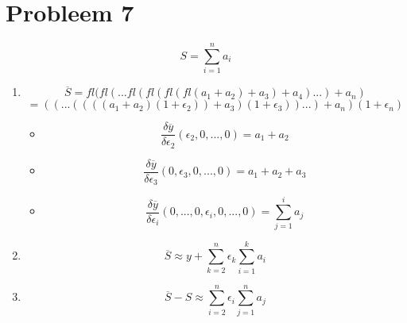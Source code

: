 \documentclass[12pt,a4paper]{article}
\begin{document}
\section{Probleem 7}
\[
S = \sum_{i=1}^na_i
\]
\begin{enumerate}
\item 
\[
\overline{S} = fl(fl(...fl(fl(fl(fl(a_1+a_2)+a_3)+a_4)...)+a_n)
\]
\[
= ((...((((a_1+a_2)(1+\epsilon_2))+a_3)(1+\epsilon_3))...)+a_n)(1+\epsilon_n)
\]

\begin{itemize}
\item
\[
\frac{\delta\overline{y}}{\delta \epsilon_2}(\epsilon_2,0,...,0)= a_1 + a_2
\]
\item
\[
\frac{\delta\overline{y}}{\delta \epsilon_3}(0,\epsilon_3,0,...,0)= a_1 + a_2 + a_3 
\]
\item
\[
\frac{\delta\overline{y}}{\delta \epsilon_i}(0,...,0,\epsilon_i,0,...,0) = \sum_{j=1}^ia_j
\]
\end{itemize}

\item
\[
\overline{S} \approx y + \sum_{k=2}^n\epsilon_k\sum_{i=1}^ka_i
\]

\item
\[
\overline{S}-S \approx \sum_{i=2}^n\epsilon_i\sum_{j=1}^na_j
\]
\end{enumerate}
\end{document}
